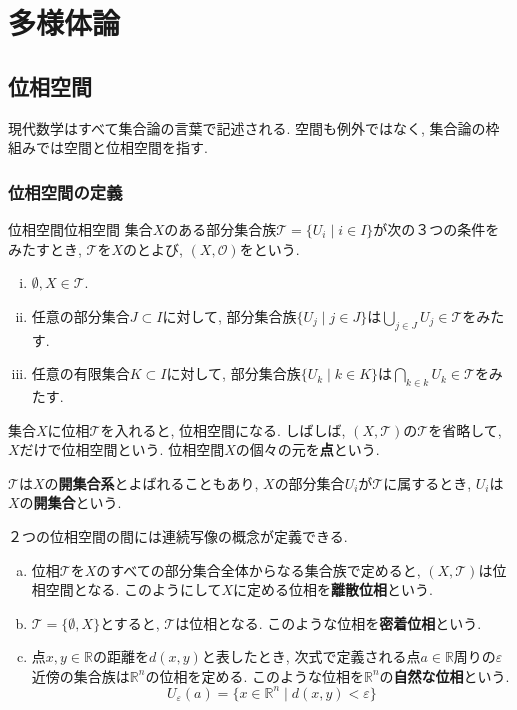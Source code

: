 \documentclass[../main]{subfiles}
\begin{document}
\chapter{多様体論}
\section{位相空間}
    現代数学はすべて集合論の言葉で記述される. 
    空間も例外ではなく, 
    集合論の枠組みでは空間と位相空間を指す. 
    
    \subsection{位相空間の定義}
        \begin{dfn}{位相空間}{位相空間}
            集合$X$のある部分集合族$\mathcal{T} = \{U_i \mid i \in I\}$が次の３つの条件をみたすとき, $\mathcal{T}$を$X$のとよび, $(X,\mathcal{O})$をという. 
            \begin{enumerate}[(i)]
                \item $\emptyset, X \in \mathcal{T}$.
                \item 任意の部分集合$J \subset I$に対して, 部分集合族$\{U_j \mid j \in J\}$は$\bigcup_{j \in J}U_j \in \mathcal{T}$をみたす. 
                \item 任意の有限集合$K \subset I$に対して, 部分集合族$\{U_k \mid k \in K\}$は$\bigcap_{k \in k}U_k \in \mathcal{T}$をみたす. 
            \end{enumerate}
        \end{dfn}
        集合$X$に位相$\mathcal{T}$を入れると, 位相空間になる. しばしば, $(X,\mathcal{T})$の$\mathcal{T}$を省略して, $X$だけで位相空間という. 位相空間$X$の個々の元を\textbf{点}という. 
        
        $\mathcal{T}$は$X$の\textbf{開集合系}とよばれることもあり, $X$の部分集合$U_i$が$\mathcal{T}$に属するとき, $U_i$は$X$の\textbf{開集合}という. 
        
        \begin{exm}{}{}
            ２つの位相空間の間には連続写像の概念が定義できる. 
            \begin{enumerate}[(a)]
                \item 位相$\mathcal{T}$を$X$のすべての部分集合全体からなる集合族で定めると, $(X,\mathcal{T})$は位相空間となる. このようにして$X$に定める位相を\textbf{離散位相}という.
                \item $\mathcal{T}=\{\emptyset, X\}$とすると, $\mathcal{T}$は位相となる. このような位相を\textbf{密着位相}という. 
                \item 点$x,y\in\mathbb{R}$の距離を$d(x,y)$と表したとき, 次式で定義される点$a \in \mathbb{R}$周りの$\varepsilon$近傍の集合族は$\mathbb{R}^n$の位相を定める. 
                このような位相を$\mathbb{R}^n$の\textbf{自然な位相}という. 
                    \begin{equation}
                        U_\varepsilon(a) = \{x \in \mathbb{R}^n \mid d(x,y)<\varepsilon\}
                    \end{equation}
            \end{enumerate}
        \end{exm}
\end{document}
